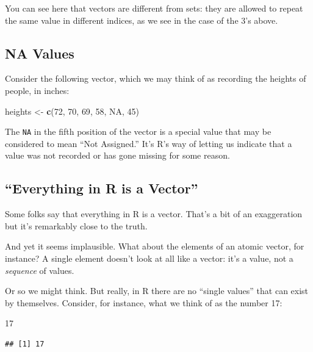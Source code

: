\documentclass[]{book}
\makeatletter
\newenvironment{Shaded}{\begin{snugshade}}{\end{snugshade}}
\newcommand{\KeywordTok}[1]{\textcolor[rgb]{0.13,0.29,0.53}{\textbf{#1}}}
\newcommand{\DecValTok}[1]{\textcolor[rgb]{0.00,0.00,0.81}{#1}}
\newcommand{\StringTok}[1]{\textcolor[rgb]{0.31,0.60,0.02}{#1}}
\newcommand{\OtherTok}[1]{\textcolor[rgb]{0.56,0.35,0.01}{#1}}
\newcommand{\NormalTok}[1]{#1}
\newenvironment{kframe}{%
\medskip{}
\setlength{\fboxsep}{.8em}
 \def\at@end@of@kframe{}%
 \ifinner\ifhmode%
  \def\at@end@of@kframe{\end{minipage}}%
  \begin{minipage}{\columnwidth}%
 \fi\fi%
 \def\FrameCommand##1{\hskip\@totalleftmargin \hskip-\fboxsep
 \colorbox{shadecolor}{##1}\hskip-\fboxsep
     \hskip-\linewidth \hskip-\@totalleftmargin \hskip\columnwidth}%
 \MakeFramed {\advance\hsize-\width
   \@totalleftmargin\z@ \linewidth\hsize
   \@setminipage}}%
 {\par\unskip\endMakeFramed%
 \at@end@of@kframe}
\renewenvironment{Shaded}{\begin{kframe}}{\end{kframe}}
\theoremstyle{definition}
\theoremstyle{definition}
\theoremstyle{definition}
\theoremstyle{remark}
\makeatother
\begin{document}
You can see here that vectors are different from sets: they are allowed
to repeat the same value in different indices, as we see in the case of
the 3's above.

\subsection{\texorpdfstring{NA Values
}{NA Values }}\label{na-values}

Consider the following vector, which we may think of as recording the
heights of people, in inches:

\begin{Shaded}
\begin{Highlighting}[]
\NormalTok{heights <-}\StringTok{ }\KeywordTok{c}\NormalTok{(}\DecValTok{72}\NormalTok{, }\DecValTok{70}\NormalTok{, }\DecValTok{69}\NormalTok{, }\DecValTok{58}\NormalTok{, }\OtherTok{NA}\NormalTok{, }\DecValTok{45}\NormalTok{)}
\end{Highlighting}
\end{Shaded}

The \texttt{NA} in the fifth position of the vector is a special value
that may be considered to mean ``Not Assigned.'' It's R's way of letting
us indicate that a value was not recorded or has gone missing for some
reason.

\subsection{\texorpdfstring{``Everything in R is a
Vector''}{Everything in R is a Vector}}\label{everything-in-r-is-a-vector}

Some folks say that everything in R is a vector. That's a bit of an
exaggeration but it's remarkably close to the truth.

And yet it seems implausible. What about the elements of an atomic
vector, for instance? A single element doesn't look at all like a
vector: it's a value, not a \emph{sequence} of values.

Or so we might think. But really, in R there are no ``single values''
that can exist by themselves. Consider, for instance, what we think of
as the number 17:

\begin{Shaded}
\begin{Highlighting}[]
\DecValTok{17}
\end{Highlighting}
\end{Shaded}

\begin{verbatim}
## [1] 17
\end{verbatim}
\end{document}
